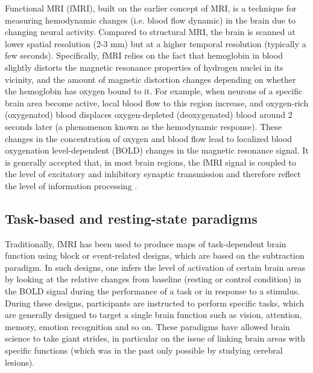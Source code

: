 Functional MRI (fMRI), built on the earlier concept of MRI, is a technique for measuring hemodynamic changes (i.e. blood flow dynamic) in the brain due to changing neural activity. Compared to structural MRI, the brain is scanned at lower spatial resolution (2-3 mm) but at a higher temporal resolution (typically a few seconds). Specifically, fMRI relies on the fact that hemoglobin in blood slightly distorts the magnetic resonance properties of hydrogen nuclei in its vicinity, and the amount of magnetic distortion changes depending on whether the hemoglobin has oxygen bound to it. For example, when neurons of a specific brain area become active, local blood flow to this region increase, and oxygen-rich (oxygenated) blood displaces oxygen-depleted (deoxygenated) blood around 2 seconds later (a phenomenon known as the hemodynamic response). These changes in the concentration of oxygen and blood flow lead to localized blood oxygenation level-dependent (BOLD) changes in the magnetic resonance signal. It is generally accepted that, in most brain regions, the fMRI signal is coupled to the level of excitatory and inhibitory synaptic transmission and therefore reflect the level of information processing \citep{logothetis_what_2008}.

\subsection{Task-based and resting-state paradigms}
\label{sec:fmri:fmri:paradigm}

Traditionally, fMRI has been used to produce maps of task-dependent brain function using block or event-related designs, which are based on the subtraction paradigm. In such designs, one infers the level of activation of certain brain areas by looking at the relative changes from baseline (resting or control condition) in the BOLD signal during the performance of a task or in response to a stimulus. During these designs, participants are instructed to perform specific tasks, which are generally designed to target a single brain function such as vision, attention, memory, emotion recognition and so on. These paradigms have allowed brain science to take giant strides, in particular on the issue of linking brain areas with specific functions (which was in the past only possible by studying cerebral lesions).

